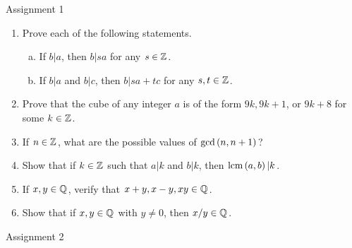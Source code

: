 \documentclass[11pt,fleqn,dvipsnames,usenames]{article}
\renewcommand{\headrulewidth}{1pt}
\begin{document}
\fancyhead[L]{\course}
\fancyhead[R]{\term}
\renewcommand{\headrulewidth}{0.4pt}

{\huge Assignment 1}
\vsp

\begin{enumerate}
\item Prove each of the following statements.
\begin{enumerate}[(a)]
\item If $b|a$, then $b|sa$ for any $s\in\mathbb{Z}$.
\item If $b|a$ and $b|c$, then $b|sa+tc$ for any $s,t\in\mathbb{Z}$.
\end{enumerate}
\item Prove that the cube of any integer $a$ is of the form $9k, 9k+1$, or $9k+8$ for some $k\in\mathbb{Z}$.
\item If $n\in \mathbb{Z}$, what are the possible values of $\text{gcd}\left(n, n+1\right)$?
\item Show that if $k\in\mathbb{Z}$ such that $a|k$ and $b|k$, then $\text{lcm}\left(a, b\right)|k$.
\item If $x,y\in\mathbb{Q}$, verify that $x+y, x-y, xy\in \mathbb{Q}$.
\item Show that if $x,y\in\mathbb{Q}$ with $y\neq 0$, then $x/y\in\mathbb{Q}$.
\end{enumerate}
\vsp

{\huge Assignment 2}
\vsp
\end{document}
